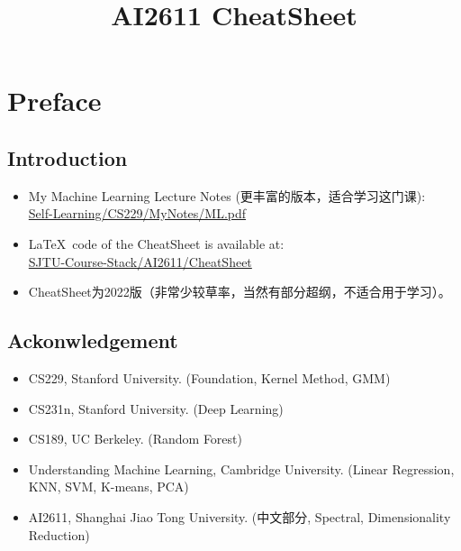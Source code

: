 \documentclass[a4paper,landscape]{article}
\begin{document}
\setlength{\abovedisplayskip}{0.5pt}
\setlength{\belowdisplayskip}{0.5pt}

\newcommand{\ds}{\displaystyle}
\title{\vspace{0.4cm} AI2611 CheatSheet}
\maketitle
\section*{\centering Preface}
\begin{minipage}[t]{0.49\linewidth}
	\subsection*{\centering \vspace{0.3cm} Introduction}
	\begin{itemize}
		\item
		      My Machine Learning Lecture Notes (更丰富的版本，适合学习这门课):\\
		      \href{https://github.com/anyeZHY/Self-Learning/blob/main/CS229/MyNotes/ML.pdf}{Self-Learning/CS229/MyNotes/ML.pdf}
		\item
		      \LaTeX\, code of the CheatSheet is available at:\\
		      \href{https://github.com/anyeZHY/SJTU-Course-Stack}{SJTU-Course-Stack/AI2611/CheatSheet}
		\item
		      CheatSheet为2022版（非常少较草率，当然有部分超纲，不适合用于学习）。
	\end{itemize}
\end{minipage}
\begin{minipage}[t]{0.49\linewidth}
	\subsection*{\centering \vspace{0.3cm} Ackonwledgement}
	\begin{itemize}
		\item CS229, Stanford University. (Foundation, Kernel Method, GMM)
		\item CS231n, Stanford University. (Deep Learning)
		\item CS189, UC Berkeley. (Random Forest)
		\item Understanding Machine Learning, Cambridge University. (Linear Regression, KNN, SVM, K-means, PCA)
		\item AI2611, Shanghai Jiao Tong University. (中文部分, Spectral, Dimensionality Reduction)
	\end{itemize}
\end{minipage}
\end{document}
